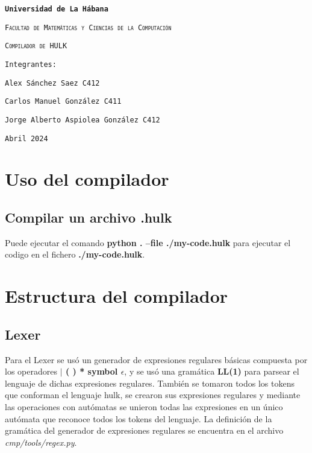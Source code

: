 \documentclass[12pt]{article}
\begin{document}
    \sloppypar
    \begin{titlepage}
        \centering
        {\bfseries\LARGE\texttt{Universidad de La Hábana} \par}
        \vspace{3cm}
        {\scshape\Large\texttt{Facultad de Matemáticas y Ciencias de la Computación} \par}
        \vspace{2cm}
        \vspace{2cm}
        {\scshape\huge\texttt{Compilador de HULK}\par}
        \vfill
        \vspace{1cm}
        {\LARGE\texttt{Integrantes:} \par}
        \vspace{0.5cm}
        {\Large\texttt{Alex Sánchez Saez C412} \par}
        {\Large\texttt{Carlos Manuel González C411} \par}
        {\Large\texttt{Jorge Alberto Aspiolea González C412} \par}
        \vfill
        {\Large\texttt{Abril 2024} \par}
    \end{titlepage}

\section{Uso del compilador}
\subsection{Compilar un archivo .hulk}
Puede ejecutar el comando \textbf{python . --file ./my-code.hulk} para ejecutar el codigo en el fichero \textbf{./my-code.hulk}.


\section{Estructura del compilador}
\subsection{Lexer}
Para el Lexer se usó un generador de expresiones regulares básicas compuesta por los operadores \textbf{$|$ ( ) * symbol $\epsilon$}, y se usó una gramática \textbf{LL(1)} para parsear el lenguaje de dichas expresiones regulares.
También se tomaron todos los tokens que conforman el lenguaje hulk, se crearon sus expresiones regulares y mediante las operaciones con autómatas se unieron todas las expresiones en un único autómata que reconoce todos los tokens del lenguaje.
La definición de la gramática del generador de expresiones regulares se encuentra en el archivo \textit{cmp/tools/regex.py}.
\end{document}
